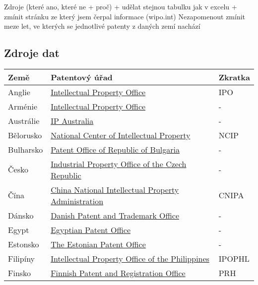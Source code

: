 Zdroje (které ano, které ne + proč) + udělat stejnou tabulku jak v excelu + zmínit stránku ze který jsem čerpal informace (wipo.int)\newline
Nezapomenout zmínit meze let, ve kterých se jednotlivé patenty z daných zemí nachází 
\subsection{Zdroje dat}
	\begin{table}[h!]
	\centering
	\begin{tabular}{|>{\centering\arraybackslash}p{2.2cm}|>{\centering\arraybackslash}p{8cm}|>{\centering\arraybackslash}p{2cm}|} 
	\hline
	\textbf{Země}    & \textbf{Patentový úřad} & \textbf{Zkratka}                \\ 
	\hline
	Anglie & \href{https://www.gov.uk/topic/intellectual-property}{Intellectual Property Office}  & IPO         \\ 
	\hline
	Arménie & \href{https://www.aipa.am/hy/}{Intellectual Property Office}  & -         \\ 
	\hline
	Austrálie & \href{https://www.ipaustralia.gov.au/}{IP Australia}  & -         \\ 
	\hline
	Bělorusko & \href{https://www.ncip.by/}{National Center of Intellectual Property}  & NCIP         \\ 
	\hline
	Bulharsko & \href{https://www.bpo.bg/}{Patent Office of Republic of Bulgaria}  & -         \\ 
	\hline
	Česko & \href{https://upv.gov.cz/}{Industrial Property Office of the Czech Republic}  & -         \\ 
	\hline
	Čína & \href{https://www.cnipa.gov.cn/}{China National Intellectual Property Administration}  & CNIPA         \\ 
	\hline
	Dánsko & \href{https://www.dkpto.org/}{Danish Patent and Trademark Office}  & -         \\ 
	\hline
	Egypt & \href{http://www.egypo.gov.eg}{Egyptian Patent Office}  & -         \\ 
	\hline
	Estonsko & \href{https://www.epa.ee/et}{The Estonian Patent Office}  & -         \\ 
	\hline
	Filipíny & \href{http://www.ipophil.gov.ph/}{Intellectual Property Office of the Philippines}  & IPOPHL         \\ 
	\hline
	Finsko & \href{http://www.prh.fi/en/index.html}{Finnish Patent and Registration Office}  & PRH         \\ 

\end{tabular}
\end{table}
